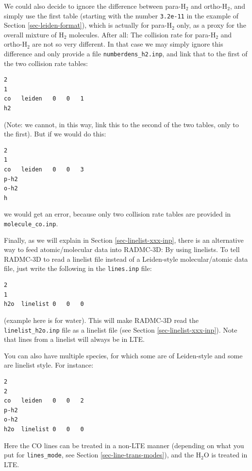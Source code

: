 \documentclass{report}
\newenvironment{asciibox}%
  {\begin{list}{}{%
    \setlength{\topsep}{0.5em}%
    \setlength{\parskip}{0em}%
    \setlength{\parsep}{0em}%
    \setlength{\itemsep}{0em}%
    \setlength{\rightmargin}{0em}%
    \setlength{\leftmargin}{3.0em}%
    \setlength{\labelsep}{1em}%
    \setlength{\labelwidth}{2em}%
  }\normalfont\footnotesize\item}
  {\end{list}}
\begin{document}
We could also decide to ignore the difference between para-H$_2$ and
ortho-H$_2$, and simply use the first table (starting with the number
{\small\tt 3.2e-11} in the example of Section \ref{sec-leiden-format}),
which is actually for para-H$_2$ only, as a proxy for the overall mixture
of H$_2$ molecules. After all: The collision rate for para-H$_2$ and
ortho-H$_2$ are not so very different. In that case we may simply ignore
this difference and only provide a file {\small\tt numberdens\_h2.inp},
and link that to the first of the two collision rate tables:
\begin{asciibox}\begin{verbatim}
2
1
co   leiden   0   0   1
h2
\end{verbatim}\end{asciibox}
(Note: we cannot, in this way, link this to the second of the two tables,
only to the first). But if we would do this:
\begin{asciibox}\begin{verbatim}
2
1
co   leiden   0   0   3
p-h2
o-h2
h
\end{verbatim}\end{asciibox}
we would get an error, because only two collision rate tables are
provided in {\small\tt molecule\_co.inp}.

Finally, as we will explain in Section \ref{sec-linelist-xxx-inp}, there
is an alternative way to feed atomic/molecular data into RADMC-3D: By using
linelists. To tell RADMC-3D to read a linelist file instead of a Leiden-style
molecular/atomic data file, just write the following in the {\small\tt lines.inp}
file:
\begin{asciibox}\begin{verbatim}
2
1
h2o  linelist 0   0   0
\end{verbatim}\end{asciibox}
(example here is for water). This will make RADMC-3D read the {\small\tt
  linelist\_h2o.inp} file as a linelist file (see Section
\ref{sec-linelist-xxx-inp}). Note that lines from a linelist will always
be in LTE. 

You can also have multiple species, for which some are of Leiden-style and some
are linelist style. For instance:
\begin{asciibox}\begin{verbatim}
2
2
co   leiden   0   0   2
p-h2
o-h2
h2o  linelist 0   0   0
\end{verbatim}\end{asciibox}
Here the CO lines can be treated in a non-LTE manner (depending on what you
put for {\small\tt lines\_mode}, see Section \ref{sec-line-trans-modes}),
and the H$_2$O is treated in LTE.
\end{document}
